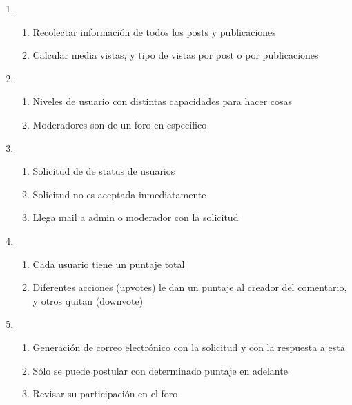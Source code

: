 \documentclass[12pt, letterpaper, notitlepage]{article}
\begin{document}
\begin{enumerate}
    

	\item {}
    	\begin{enumerate}
			\item Recolectar información de todos los posts y publicaciones
			\item Calcular media vistas, y tipo de vistas por post o por publicaciones
		\end{enumerate}
		
	\item {}
		\begin{enumerate}
			\item Niveles de usuario con distintas capacidades para hacer cosas
			\item Moderadores son de un foro en específico
		\end{enumerate}
		
	\item {}
		\begin{enumerate}
			\item Solicitud de  de status de usuarios
			\item Solicitud no es aceptada inmediatamente
			\item Llega mail a admin o moderador con la solicitud
		\end{enumerate}
		
	\item {}
		\begin{enumerate}
			\item Cada usuario tiene un puntaje total
			\item Diferentes acciones (upvotes) le dan un puntaje al creador del comentario, y otros quitan (downvote)	
		\end{enumerate}
		
	\item {}
		\begin{enumerate}
			\item Generación de correo electrónico con la solicitud y con la respuesta a esta
			\item Sólo se puede postular con determinado puntaje en adelante
			\item Revisar su participación en el foro
		\end{enumerate}
		

\end{enumerate}
\end{document}
